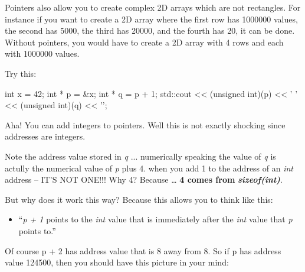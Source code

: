 Pointers also allow you to create complex 2D arrays which are not
rectangles. For instance if you want to create a 2D array where the
first row has 1000000 values, the second has 5000, the third has 20000,
and the fourth has 20, it can be done. Without pointers, you would have
to create a 2D array with 4 rows and each with 1000000 values.


\newpage{}

Try this:

\begin{consolethree}[escapeinside=||]
int x = 42;
int * p = &x;
int * q = p + 1;
std::cout << (unsigned int)(p) << ' '
          << (unsigned int)(q) << '\n';
\end{consolethree}

Aha! You can add integers to pointers. Well this is not exactly shocking
since addresses are integers.

Note the address value stored in \textit{q} ... numerically speaking the
value of \textit{q} is actully the numerical value of \textit{p} plus 4.
when you add 1 to the address of an \textit{int} address --
IT'S NOT ONE!!! Why 4? Because \ldots{} \textbf{4 comes
from} \textit{\textbf{sizeof(int)}}.

But why does it work this way? Because this allows you to think like
this:

\begin{itemize}
\item ``\textit{p + 1} points to the \textit{int} value that is immediately
  after the \textit{int} value that \textit{p} points to.''
\end{itemize}

Of course p + 2 has address value that is 8 away from 8. So if p has
address value 124500, then you should have this picture in your mind:

